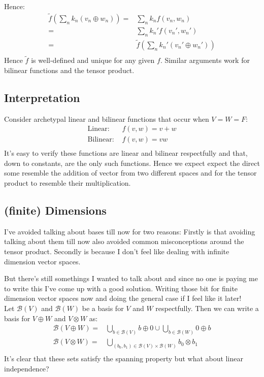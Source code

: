 Hence:
\begin{equation*}
\begin{aligned}
	\tilde{f}\left(\sum_nk_n(v_n\oplus w_n)\right) =& \sum_nk_nf(v_n,w_n)\\
	=& \sum_nk_n'f(v_n',w_n')\\
	=&\tilde{f}\left(\sum_nk_n'(v_n'\oplus w_n')\right) \\
\end{aligned}
\end{equation*}
Hence $\tilde{f}$ is well-defined and unique for any given $f$.
Similar arguments work for bilinear functions and the tensor product.

\subsection{Interpretation}
Consider archetypal linear and bilinear functions that occur when $V=W=F$:
\begin{equation*}
\begin{aligned}
	\text{Linear: }&f(v,w) = v+w\\
	\text{Bilinear: }&f(v,w) = vw\\
\end{aligned}
\end{equation*}
It's easy to verify these functions are linear and bilinear respectfully and that,
down to constants,
are the only such functions.
Hence we expect expect the direct some resemble the addition of vector from two different spaces and for the tensor product to resemble their multiplication.

\subsection{(finite) Dimensions}
I've avoided talking about bases till now for two reasons:
Firstly is that avoiding talking about them till now also avoided common misconceptions around the tensor product.
Secondly is because I don't feel like dealing with infinite dimension vector spaces.

But there's still somethings I wanted to talk about and since no one is paying me to write this I've come up with a good solution.
Writing those bit for finite dimension vector spaces now and doing the general case if I feel like it later!
\\

Let $\mathcal{B}(V)$ and $\mathcal{B}(W)$ be a basis for $V$ and $W$ respectfully.
Then we can write a basis for $V\oplus W$ and $V\otimes W$ as:
\begin{equation*}
\begin{aligned}
	\mathcal{B}(V\oplus W) =& \bigcup_{b\in\mathcal{B}(V)}b\oplus0\cup\bigcup_{b\in\mathcal{B}(W)}0\oplus b\\
	\mathcal{B}(V\otimes W) =& \bigcup_{(b_0,b_1)\in\mathcal{B}(V)\times\mathcal{B}(W)}b_0\otimes b_1\\
\end{aligned}
\end{equation*}
It's clear that these sets satisfy the spanning property but what about linear independence?
\\

